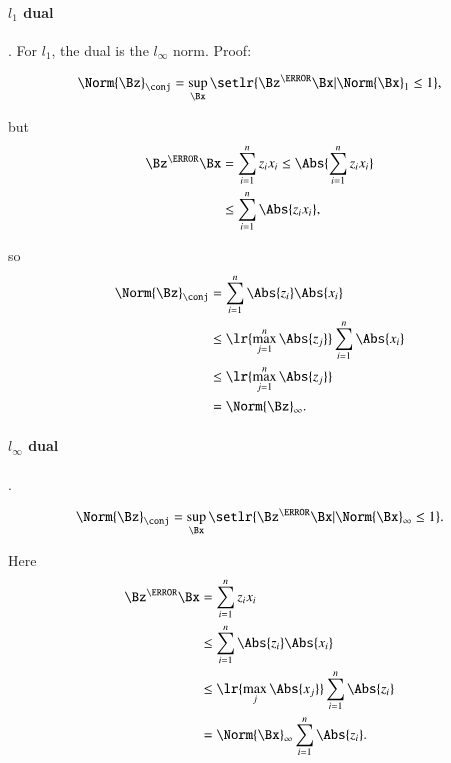 \paragraph{\( l_1 \) dual}.
For \( l_1 \), the dual is the \( l_\infty \) norm.  Proof:

\begin{equation}\label{eqn:convex-optimizationLecture2:184}
\Norm{\Bz}_\conj
=
\sup_\Bx \setlr{ \Bz^\T \Bx | \Norm{\Bx}_1 \le 1 },
\end{equation}

but
\begin{equation}\label{eqn:convex-optimizationLecture2:204}
\begin{aligned}
\Bz^\T \Bx
&=
\sum_{i=1}^n z_i x_i \le
\Abs{
\sum_{i=1}^n z_i x_i
} \\
&\le
\sum_{i=1}^n \Abs{z_i x_i },
\end{aligned}
\end{equation}

so
\begin{equation}\label{eqn:convex-optimizationLecture2:224}
\begin{aligned}
\Norm{\Bz}_\conj
&= \sum_{i=1}^n \Abs{z_i}\Abs{ x_i } \\
&\le \lr{ \max_{j=1}^n \Abs{z_j} }
\sum_{i=1}^n \Abs{ x_i } \\
&\le \lr{ \max_{j=1}^n \Abs{z_j} } \\
&=
\Norm{\Bz}_\infty.
\end{aligned}
\end{equation}


\paragraph{\( l_\infty \) dual}.


\begin{equation}\label{eqn:convex-optimizationLecture2:244}
\Norm{\Bz}_\conj
=
\sup_\Bx \setlr{ \Bz^\T \Bx | \Norm{\Bx}_\infty \le 1 }.
\end{equation}

Here
\begin{equation}\label{eqn:convex-optimizationLecture2:264}
\begin{aligned}
\Bz^\T \Bx
&= \sum_{i=1}^n z_i x_i \\
&\le \sum_{i=1}^n \Abs{z_i}\Abs{ x_i } \\
&\le \lr{ \max_j \Abs{ x_j } } \sum_{i=1}^n \Abs{z_i} \\
&= \Norm{\Bx}_\infty \sum_{i=1}^n \Abs{z_i}.
\end{aligned}
\end{equation}

